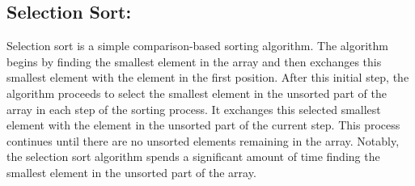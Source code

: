 \documentclass[a4paper,12pt,twocolumn]{article}
\begin{document}
\subsection{Selection Sort:}
Selection sort is a simple comparison-based sorting algorithm. The algorithm begins by finding the smallest element in the array and then exchanges this smallest element with the element in the first position. After this initial step, the algorithm proceeds to select the smallest element in the unsorted part of the array in each step of the sorting process. It exchanges this selected smallest element with the element in the unsorted part of the current step. This process continues until there are no unsorted elements remaining in the array. Notably, the selection sort algorithm spends a significant amount of time finding the smallest element in the unsorted part of the array.
\end{document}
